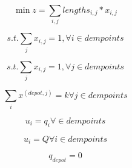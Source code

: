 \documentclass[preprint,review, 11pt,3p,authoryear]{elsarticle}
\begin{document}









\begin{equation}
\label{eq01}
\min z =   \sum_{i,j} lengths_{i,j} *  x_{i,j}
\end{equation}



\begin{equation}
\label{eq02}
s.t. \sum_{j} x_{i,j} =1, \forall i \in dempoints
\end{equation}


\begin{equation}
  \label{eq02_2}
  s.t. \sum_{j} x_{i,j} =1, \forall j \in dempoints
  \end{equation}
  
  


\begin{equation}
\label{eq03}
\sum_{i} x^{(depot,j)} =k  \forall j \in dempoints
\end{equation}



\begin{equation}
\label{eq04}
u_{i} =q_{i}  \forall  \in dempoints
\end{equation}


\begin{equation}
  \label{eq05}
  u_{i} =Q  \forall  i  \in dempoints
  \end{equation}

\begin{equation}
\label{eq06}
q_{depot} = 0 
\end{equation}
\end{document}
